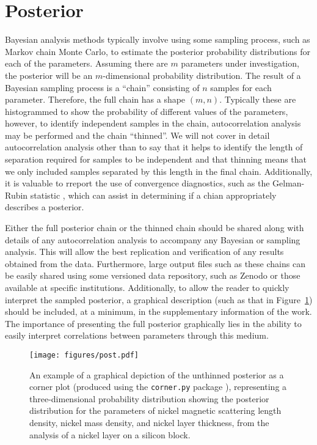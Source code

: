\documentclass[reprint,superscriptaddress,aps,amsmath,linenumbers]{revtex4-2}
\begin{document}
\section{Posterior}
\label{sec:posterior}

Bayesian analysis methods typically involve using some sampling process, such as Markov chain Monte Carlo, to estimate the posterior probability distributions for each of the parameters. 
Assuming there are $m$ parameters under investigation, the posterior will be an $m$-dimensional probability distribution. 
The result of a Bayesian sampling process is a ``chain'' consisting of $n$ samples for each parameter. 
Therefore, the full chain has a shape $(m, n)$. 
Typically these are histogrammed to show the probability of different values of the parameters, however, to identify independent samples in the chain, autocorrelation analysis may be performed and the chain ``thinned''. 
We will not cover in detail autocorrelation analysis other than to say that it helps to identify the length of separation required for samples to be independent and that thinning means that we only included samples separated by this length in the final chain.
Additionally, it is valuable to rreport the use of convergence diagnostics, such as the Gelman-Rubin statistic \cite{gelman_inference_1992}, which can assist in determining if a chian appropriately describes a posterior. 

Either the full posterior chain or the thinned chain should be shared along with details of any autocorrelation analysis to accompany any Bayesian or sampling analysis. 
This will allow the best replication and verification of any results obtained from the data. 
Furthermore, large output files such as these chains can be easily shared using some versioned data repository, such as Zenodo or those available at specific institutions. 
Additionally, to allow the reader to quickly interpret the sampled posterior, a graphical description (such as that in Figure~\ref{fig:post}) should be included, at a minimum, in the supplementary information of the work. 
The importance of presenting the full posterior graphically lies in the ability to easily interpret correlations between parameters through this medium. 
%
\begin{figure}
  \texttt{[image: figures/post.pdf]}
  \caption{
    An example of a graphical depiction of the unthinned posterior as a corner plot (produced using the \texttt{corner.py} package \cite{foremanmackey_corner_2016}), representing a three-dimensional probability distribution showing the posterior distribution for the parameters of nickel magnetic scattering length density, nickel mass density, and nickel layer thickness, from the analysis of a nickel layer on a silicon block.
  }
  \label{fig:post}
\end{figure}
%
\end{document}
